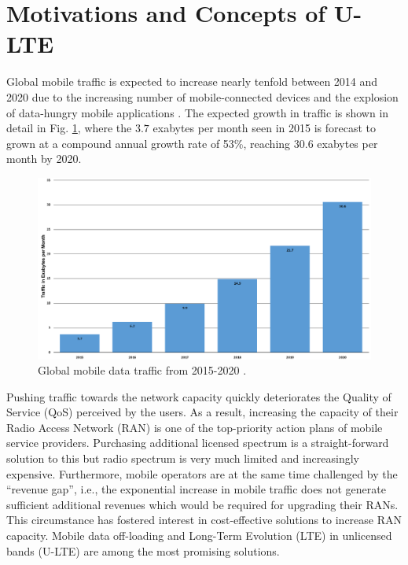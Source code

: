 \section{Motivations and Concepts of U-LTE}
\label{lte-motiv}

Global mobile traffic is expected to increase nearly tenfold between 2014 and 2020 due to the increasing number of mobile-connected devices and the explosion of data-hungry mobile applications \cite{cisco_mobile_traffic_2015}. The expected growth in traffic is shown in detail in Fig. \ref{figs:global-mobile-data-traffic-2015-2020}, where the $3.7$ exabytes per month seen in 2015 is forecast to grown at a compound annual growth rate of 53\%, reaching $30.6$ exabytes per month by 2020. 
\begin{figure}[!ht]
	\centering
	\includegraphics[width=\textwidth]{figs/global-mobile-data-traffic-2015-2020}
	\caption{Global mobile data traffic from 2015-2020 \cite{cisco_mobile_traffic_2015}.}
	\label{figs:global-mobile-data-traffic-2015-2020}
\end{figure}
Pushing traffic towards the network capacity quickly deteriorates the Quality of Service (QoS) perceived by the users. As a result, increasing the capacity of their Radio Access Network (RAN) is one of the top-priority action plans of mobile service providers. Purchasing additional licensed spectrum is a straight-forward solution to this but radio spectrum is very much limited and increasingly expensive. Furthermore, mobile operators are at the same time challenged by the ``revenue gap'', i.e., the exponential increase in mobile traffic does not generate sufficient additional revenues which would be required for upgrading their RANs. This circumstance has fostered interest in cost-effective solutions to increase RAN capacity. Mobile data off-loading and Long-Term Evolution (LTE) in unlicensed bands (\mbox{U-LTE}) are among the most promising solutions.

